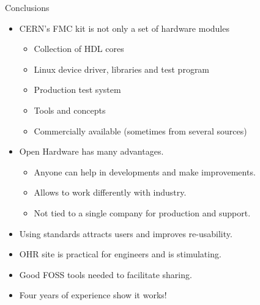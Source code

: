 \documentclass[compress,red]{beamer}
\begin{document}
\begin{frame}{Conclusions}

  \begin{block}{}
    \begin{itemize}
      \pause
    \item CERN's FMC kit is not only a set of hardware modules
      \begin{itemize}
      \item Collection of HDL cores
      \item Linux device driver, libraries and test program
      \item Production test system
      \item Tools and concepts %
      \item Commercially available (sometimes from several sources)
      \end{itemize}
      \pause
     \item Open Hardware has many advantages.
      \begin{itemize}
      \item Anyone can help in developments and make improvements.
      \item Allows to work differently with industry. %
      \item Not tied to a single company for production and support.
      \end{itemize}
      \pause
    \item Using standards attracts users and improves re-usability. %
      \pause
    \item OHR site is practical for engineers and is stimulating.
      \pause
    \item Good FOSS tools needed to facilitate sharing.
      \pause
    \item Four years of experience show it works!
    \end{itemize}
  \end{block}

  \note[item]{}

\end{frame}
\end{document}
